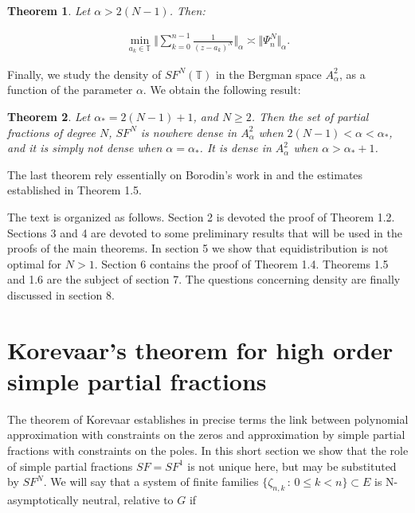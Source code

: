 \documentclass{amsart}[11pt]
\newcommand{\T}{\mathbb{T}} %
\newcommand{\sbs}{\subset} %
\newtheorem{theorem}{Theorem}[section]
\theoremstyle{definition}
\begin{document}
\begin{theorem}
    Let $\alpha > 2(N-1)$. Then:

    \begin{gather*}
        \min_{a_k \in \T} \bigg \Vert \sum_{k=0}^{n-1} \frac{1}{(z-a_k)^N} \bigg \Vert_{\alpha} \asymp \Vert \Psi_n^N \Vert_{\alpha}.
    \end{gather*}
\end{theorem}

Finally, we study the density of $SF^N(\T)$ in the Bergman space $A^2_{\alpha}$, as a function of the parameter $\alpha$. We obtain the following result:

\begin{theorem}
Let $\alpha_{\ast} = 2(N-1)+1$, and $N \geq 2$. Then the set of partial fractions of degree $N$, $SF^N$ is nowhere dense in $A^2_{\alpha}$ when $2(N-1)< \alpha < \alpha_{\ast}$, and it is simply not dense when $\alpha = \alpha_{\ast}$. It is dense in $A^2_{\alpha}$ when $\alpha > \alpha_{\ast} + 1$.
\end{theorem}


The last theorem rely essentially on Borodin's work in \cite{Borodin2014} and the estimates established in Theorem 1.5.

The text is organized as follows. Section 2 is devoted the proof of Theorem 1.2. Sections 3 and 4 are devoted to some preliminary results that will be used in the proofs of the main theorems. In section 5 we show that equidistribution is not optimal for $N>1$. Section 6 contains the proof of Theorem 1.4. Theorems 1.5 and 1.6 are the subject of section 7. The questions concerning density are finally discussed in section 8.













\section{Korevaar's theorem for high order simple partial fractions}

The theorem of Korevaar establishes in precise terms the link between polynomial approximation with constraints on the zeros and approximation by simple partial fractions with constraints on the poles. In this short section we show that the role of simple partial fractions $SF= SF^1$ is not unique here, but may be substituted by $SF^N$. We will say that a system of finite families $\{ \zeta_{n,k} \, : \, 0 \leq k < n \} \sbs E$ is N-asymptotically neutral, relative to $G$ if 
\end{document}
